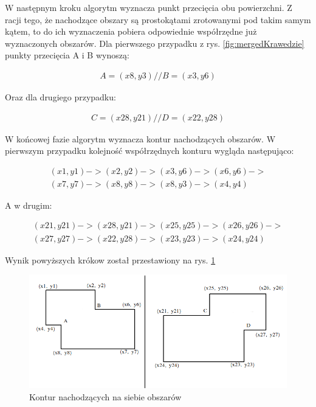 W następnym kroku algorytm wyznacza punkt przecięcia obu powierzchni. Z racji tego, że nachodzące obszary są prostokątami zrotowanymi pod takim samym kątem, to do ich wyznaczenia pobiera odpowiednie współrzędne już wyznaczonych obszarów. Dla pierwszego przypadku z rys. \ref{fig:mergedKrawedzie} punkty przecięcia A i B wynoszą:

\begin{equation}
\begin{split}
A = (x8, y3) //
B = (x3, y6)
\end{split}
\end{equation}

Oraz dla drugiego przypadku:

\begin{equation}
\begin{split}
C = (x28, y21) //
D = (x22, y28)
\end{split}
\end{equation}

W końcowej fazie algorytm wyznacza kontur nachodzących obszarów. W pierwszym przypadku kolejność współrzędnych konturu wygląda następująco:
 
\begin{equation}
\begin{split}
(x1, y1) -> (x2, y2) -> (x3, y6) -> (x6, y6) ->  \\
(x7, y7) -> (x8, y8) -> (x8, y3) -> (x4, y4)
\end{split}
\end{equation}

A w drugim: 

\begin{equation}
\begin{split}
(x21, y21) -> (x28, y21) -> (x25, y25) -> (x26, y26) ->  \\
(x27, y27) -> (x22, y28) -> (x23, y23) -> (x24, y24)
\end{split}
\end{equation}

Wynik powyższych krókow został przestawiony na rys. \ref{fig:mergedKrawedzieKontur}

\begin{figure}[h]
\caption{Kontur nachodzących na siebie obszarów}
\label{fig:mergedKrawedzieKontur}
\centering
\includegraphics[width=1.1\textwidth]{mergedKrawedzieKontur}
\end{figure}

